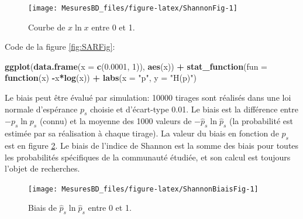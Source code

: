 \documentclass[
  11pt,
  french,
  a4paper,
  extrafontsizes,onecolumn,openright
  ]{memoir}
\newenvironment{Shaded}{\begin{snugshade}}{\end{snugshade}}
\newcommand{\ControlFlowTok}[1]{\textcolor[rgb]{0.13,0.29,0.53}{\textbf{#1}}}
\newcommand{\DataTypeTok}[1]{\textcolor[rgb]{0.13,0.29,0.53}{#1}}
\newcommand{\DecValTok}[1]{\textcolor[rgb]{0.00,0.00,0.81}{#1}}
\newcommand{\FloatTok}[1]{\textcolor[rgb]{0.00,0.00,0.81}{#1}}
\newcommand{\KeywordTok}[1]{\textcolor[rgb]{0.13,0.29,0.53}{\textbf{#1}}}
\newcommand{\NormalTok}[1]{#1}
\newcommand{\OperatorTok}[1]{\textcolor[rgb]{0.81,0.36,0.00}{\textbf{#1}}}
\newcommand{\StringTok}[1]{\textcolor[rgb]{0.31,0.60,0.02}{#1}}
\begin{document}
\scriptsize

\begin{figure}

{\centering \texttt{[image: MesuresBD\_files/figure-latex/ShannonFig-1]} 

}

\caption{Courbe de \(x\ln x\) entre 0 et 1.}\label{fig:ShannonFig}
\end{figure}

\normalsize

Code de la figure \ref{fig:SARFig}:

\scriptsize

\begin{Shaded}
\begin{Highlighting}[]
\KeywordTok{ggplot}\NormalTok{(}\KeywordTok{data.frame}\NormalTok{(}\DataTypeTok{x =} \KeywordTok{c}\NormalTok{(}\FloatTok{0.0001}\NormalTok{, }\DecValTok{1}\NormalTok{)), }\KeywordTok{aes}\NormalTok{(x)) }\OperatorTok{+}\StringTok{ }
\StringTok{    }\KeywordTok{stat_function}\NormalTok{(}\DataTypeTok{fun =} \ControlFlowTok{function}\NormalTok{(x) }\OperatorTok{-}\NormalTok{x}\OperatorTok{*}\KeywordTok{log}\NormalTok{(x)) }\OperatorTok{+}
\StringTok{    }\KeywordTok{labs}\NormalTok{(}\DataTypeTok{x =} \StringTok{"p"}\NormalTok{, }\DataTypeTok{y =} \StringTok{"H(p)"}\NormalTok{)}
\end{Highlighting}
\end{Shaded}

\normalsize

Le biais peut être évalué par simulation: 10000 tirages sont réalisés dans une loi normale d'espérance \(p_s\) choisie et d'écart-type 0.01.
Le biais est la différence entre \({-p}_s{\ln p_s}\) (connu) et la moyenne des 1000 valeurs de \(-\hat{p}_s{\ln{\hat{p}}_s}\) (la probabilité est estimée par sa réalisation à chaque tirage).
La valeur du biais en fonction de \(p_s\) est en figure \ref{fig:ShannonBiaisFig}.
Le biais de l'indice de Shannon est la somme des biais pour toutes les probabilités spécifiques de la communauté étudiée, et son calcul est toujours l'objet de recherches.



\scriptsize

\begin{figure}

{\centering \texttt{[image: MesuresBD\_files/figure-latex/ShannonBiaisFig-1]} 

}

\caption{Biais de \(\hat{p}_s \ln\hat{p}_s\) entre 0 et 1.}\label{fig:ShannonBiaisFig}
\end{figure}
\end{document}
